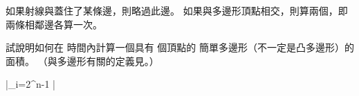 \startANSWER
如果射線與蓋住了某條邊，則略過此邊。
如果與多邊形頂點相交，則算兩個，即兩條相鄰邊各算一次。
\stopANSWER

\startEXERCISE
試說明如何在  時間內計算一個具有  個頂點的
簡單多邊形（不一定是凸多邊形）的面積。
（與多邊形有關的定義見。）
\stopEXERCISE

\startANSWER
\startformula
{} \left|\sum_{i=2}^{n-1}  \times {} \right|
\stopformula
\stopANSWER

\stopsection
